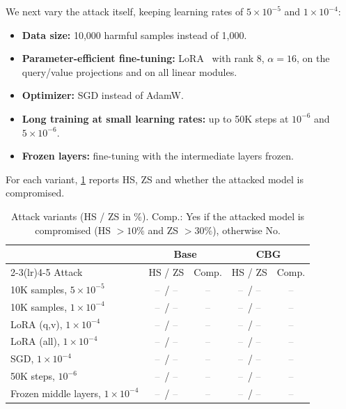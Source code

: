 \documentclass[11pt]{article}
\newcommand{\tbd}{\textcolor{gray}{--}}
\begin{document}
We next vary the attack itself, keeping learning rates of $5\times10^{-5}$ and $1\times10^{-4}$:
\begin{itemize}
  \item \textbf{Data size:} 10{,}000 harmful samples instead of 1{,}000.
  \item \textbf{Parameter-efficient fine-tuning:} LoRA~\citep{hu2022lora} with rank 8, $\alpha=16$, on the query/value projections and on all linear modules.
  \item \textbf{Optimizer:} SGD instead of AdamW.
  \item \textbf{Long training at small learning rates:} up to 50K steps at $10^{-6}$ and $5\times10^{-6}$.
  \item \textbf{Frozen layers:} fine-tuning with the intermediate layers frozen.
\end{itemize}
For each variant, \cref{tab:variants} reports HS, ZS and whether the attacked model is compromised.

\begin{table}[t]
\centering
\small
\caption{Attack variants (HS / ZS in \%). Comp.: Yes if the attacked model is compromised (HS $>10\%$ and ZS $>30\%$), otherwise No.}
\label{tab:variants}
\begin{tabular}{lcccc}
\toprule
& \multicolumn{2}{c}{Base} & \multicolumn{2}{c}{CBG}\\
\cmidrule(lr){2-3}\cmidrule(lr){4-5}
Attack & HS / ZS & Comp. & HS / ZS & Comp.\\
\midrule
10K samples, $5\times10^{-5}$          & \tbd\ / \tbd & \tbd & \tbd\ / \tbd & \tbd\\
10K samples, $1\times10^{-4}$          & \tbd\ / \tbd & \tbd & \tbd\ / \tbd & \tbd\\
LoRA (q,v), $1\times10^{-4}$           & \tbd\ / \tbd & \tbd & \tbd\ / \tbd & \tbd\\
LoRA (all), $1\times10^{-4}$           & \tbd\ / \tbd & \tbd & \tbd\ / \tbd & \tbd\\
SGD, $1\times10^{-4}$                  & \tbd\ / \tbd & \tbd & \tbd\ / \tbd & \tbd\\
50K steps, $10^{-6}$                   & \tbd\ / \tbd & \tbd & \tbd\ / \tbd & \tbd\\
Frozen middle layers, $1\times10^{-4}$ & \tbd\ / \tbd & \tbd & \tbd\ / \tbd & \tbd\\
\bottomrule
\end{tabular}
\end{table}
\end{document}
